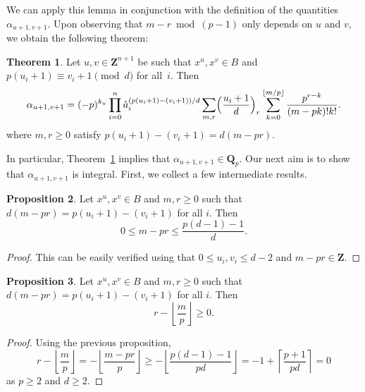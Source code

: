 \documentclass[a4paper,11pt]{article}
\numberwithin{equation}{section}
\providecommand{\floor}[1]{\left\lfloor#1\right\rfloor}   %
\providecommand{\ceil}[1]{\left\lceil#1\right\rceil}   %
\newcommand{\ZZ}{\mathbf{Z}} %
\newcommand{\QQ}{\mathbf{Q}} %
\theoremstyle{definition}
\newtheorem{thm}{Theorem}[section]
\newtheorem{prop}[thm]{Proposition}
\begin{document}
We can apply this lemma in conjunction with the definition 
of the quantities $\alpha_{u+1, v+1}$.  Upon observing that 
$m - r \bmod{(p-1)}$ only depends on $u$ and $v$, we obtain the 
following theorem:

\begin{thm} \label{thm:alpha}
Let $u, v \in \ZZ^{n+1}$ be such that 
$x^u, x^v \in B$ and 
$p (u_i + 1) \equiv v_i + 1 \pmod{d}$ for all~$i$. 
Then 
\begin{equation}
\alpha_{u+1,v+1} = (-p)^{k_u} \prod_{i=0}^n 
    \hat{a}_i^{(p (u_i + 1) - (v_i + 1))/d} \sum_{m,r} 
    \Bigl(\frac{u_i+1}{d}\Bigr)_r 
    \sum_{k=0}^{\floor{m/p}} \frac{p^{r-k}}{(m-pk)! k!}.
\end{equation}
where $m, r \geq 0$ satisfy $p (u_i + 1) - (v_i + 1) = d (m - pr)$.
\hfill \qedsymbol
\end{thm}

In particular, Theorem~\ref{thm:alpha} implies that 
$\alpha_{u+1, v+1} \in \QQ_p$.  Our next aim is to show
that $\alpha_{u+1,v+1}$ is integral.  First, we collect a few 
intermediate results.

\begin{prop} \label{prop:mpr1}
Let $x^u, x^v \in B$ and 
$m, r \geq 0$ such that $d(m-pr) = p(u_i + 1) - (v_i + 1)$ for all $i$.  Then 
\begin{equation*}
0 \leq m - p r \leq \frac{p(d-1)-1}{d}.
\end{equation*}

\end{prop}

\begin{proof}
This can be easily verified using that $0 \leq u_i, v_i \leq d - 2$ 
and $m - pr \in \ZZ$.
\end{proof}

\begin{prop} \label{prop:mpr2}
Let $x^u, x^v \in B$
and $m, r \geq 0$ such that $d(m-pr) = p(u_i + 1) - (v_i + 1)$ for all $i$.  Then 
\begin{equation*}
r - \floor{\frac{m}{p}} \geq 0.
\end{equation*}
\end{prop}

\begin{proof}
Using the previous proposition,
\begin{equation*}
r - \floor{\frac{m}{p}} 
= - \floor{\frac{m-pr}{p}} 
\geq - \floor{\frac{p(d-1)-1}{pd}} 
= -1 + \ceil{\frac{p + 1}{pd}} 
= 0 
\end{equation*}
as $p \geq 2$ and $d \geq 2$.
\end{proof}
\end{document}

